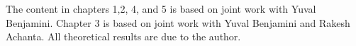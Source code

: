 \documentclass[12pt]{report}
\begin{document}
The content in chapters 1,2, 4, and 5 is based on joint work with
Yuval Benjamini.  Chapter 3 is based on joint work with Yuval
Benjamini and Rakesh Achanta.  All theoretical results are due to the
author.

    \afterpreface


 

 
 
 


\appendix %



%
%

%

 

\printbibliography[heading=bibintoc]




\end{document}
